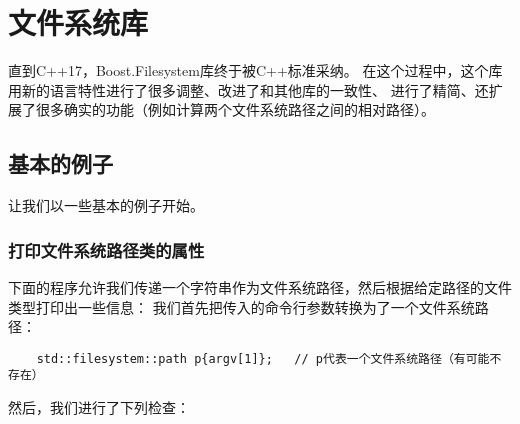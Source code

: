 \chapter{文件系统库}\label{ch20}
直到C++17，Boost.Filesystem库终于被C++标准采纳。
在这个过程中，这个库用新的语言特性进行了很多调整、改进了和其他库的一致性、
进行了精简、还扩展了很多确实的功能（例如计算两个文件系统路径之间的相对路径）。

\section{基本的例子}
让我们以一些基本的例子开始。

\subsection{打印文件系统路径类的属性}
下面的程序允许我们传递一个字符串作为文件系统路径，然后根据给定路径的文件类型打印出一些信息：
我们首先把传入的命令行参数转换为了一个文件系统路径：
\begin{lstlisting}
    std::filesystem::path p{argv[1]};   // p代表一个文件系统路径（有可能不存在）
\end{lstlisting}
然后，我们进行了下列检查：
